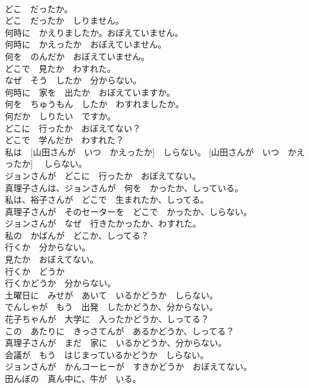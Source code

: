 \documentclass[8pt]{extreport}
\begin{document}
\begin{CJK}{UTF8}{min}
\\	どこ　だったか。	
\\	どこ　だったか　しりません。	
\\	何時に　かえりましたか。おぼえていません。	
\\	何時に　かえったか　おぼえていません。	
\\	何を　のんだか　おぼえていません。	
\\	どこで　見たか　わすれた。	
\\	なぜ　そう　したか　分からない。	
\\	何時に　家を　出たか　おぼえていますか。	
\\	何を　ちゅうもん　したか　わすれましたか。	
\\	何だか　しりたい　ですか。	
\\	どこに　行ったか　おぼえてない？	
\\	どこで　学んだか　わすれた？	
\\	私は　[山田さんが　いつ　かえったか]　しらない。 [山田さんが　いつ　かえったか]　 しらない。	
\\	ジョンさんが　どこに　行ったか　おぼえてない。	
\\	真理子さんは、ジョンさんが　何を　かったか、しっている。	
\\	私は、裕子さんが　どこで　生まれたか、しってる。	
\\	真理子さんが　そのセーターを　どこで　かったか、しらない。	
\\	ジョンさんが　なぜ　行きたかったか、わすれた。	
\\	私の　かばんが　どこか、しってる？	
\\	行くか　分からない。	
\\	見たか　おぼえてない。	
\\	行くか　どうか	
\\	行くかどうか　分からない。	
\\	土曜日に　みせが　あいて　いるかどうか　しらない。	
\\	でんしゃが　もう　出発　したかどうか、分からない。	
\\	花子ちゃんが　大学に　入ったかどうか、しってる？	
\\	この　あたりに　きっさてんが　あるかどうか、しってる？	
\\	真理子さんが　まだ　家に　いるかどうか、分からない。	
\\	会議が　もう　はじまっているかどうか　しらない。	
\\	ジョンさんが　かんコーヒーが　すきかどうか　おぼえてない。	
\\	田んぼの　真ん中に、牛が　いる。	

\end{CJK}
\end{document}
